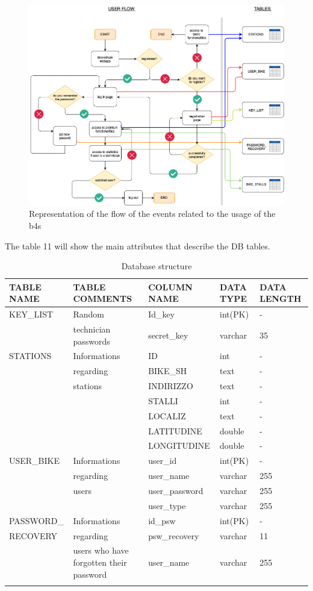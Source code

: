 \documentclass{article}
\begin{document}
\begin{figure}[H]
    \centering
    \includegraphics[width=0.99\linewidth]{image/flowchart.png}
    \caption{Representation of the flow of the events related to the usage of the b4s}
    \label{fig:flow}
\end{figure}

The table 11 will show the main attributes that describe the DB tables.
\\ 
\begin{longtable}{|p{}|p{}|l|p{}|p{}|}
 \hline TABLE NAME &   TABLE COMMENTS &    COLUMN NAME & DATA TYPE & DATA LENGTH    \\
 \hline
 KEY\_LIST &  Random  & Id\_key &int(PK)& - \\ 
 & technician passwords &  secret\_key & varchar & 35 \\
 \hline
 STATIONS  &   Informations   & ID &int & - \\
  & regarding & BIKE\_SH & text & - \\
  & stations & INDIRIZZO & text & - \\
  & & STALLI & int & - \\
  & & LOCALIZ & text & - \\
  & & LATITUDINE & double & - \\
  & & LONGITUDINE & double & - \\
 \hline
 USER\_BIKE &  Informations & user\_id & int(PK)& -\\
 & regarding & user\_name & varchar & 255 \\
 & users & user\_password & varchar & 255 \\
 & & user\_type & varchar & 255\\
 \hline 
 PASSWORD\_ &  Informations  & id\_psw & int(PK)& -\\
 RECOVERY & regarding & psw\_recovery & varchar & 11 \\
 & users who have forgotten their password & user\_name & varchar & 255 \\
 \hline
\caption{Database structure} \\
\end{longtable}
\end{document}
